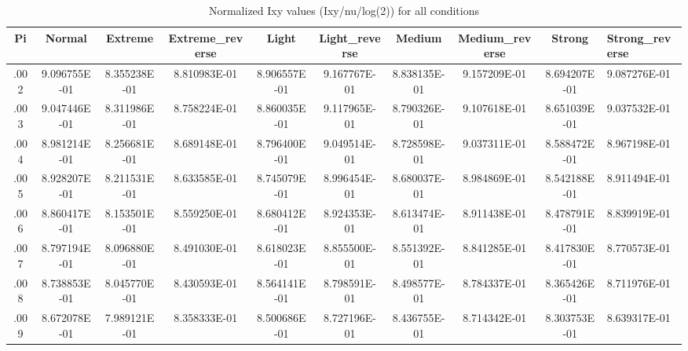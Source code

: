\begin{table}[htbp]
\centering
\caption{Normalized Ixy values (Ixy/nu/log(2)) for all conditions}
\begin{tabular}{|c|cccccccc|}
\hline
Pi & Normal & Extreme & Extreme\_reverse & Light & Light\_reverse & Medium & Medium\_reverse & Strong & Strong\_reverse \\
\hline
.002 & 9.096755E-01 & 8.355238E-01 & 8.810983E-01 & 8.906557E-01 & 9.167767E-01 & 8.838135E-01 & 9.157209E-01 & 8.694207E-01 & 9.087276E-01 \\
.003 & 9.047446E-01 & 8.311986E-01 & 8.758224E-01 & 8.860035E-01 & 9.117965E-01 & 8.790326E-01 & 9.107618E-01 & 8.651039E-01 & 9.037532E-01 \\
.004 & 8.981214E-01 & 8.256681E-01 & 8.689148E-01 & 8.796400E-01 & 9.049514E-01 & 8.728598E-01 & 9.037311E-01 & 8.588472E-01 & 8.967198E-01 \\
.005 & 8.928207E-01 & 8.211531E-01 & 8.633585E-01 & 8.745079E-01 & 8.996454E-01 & 8.680037E-01 & 8.984869E-01 & 8.542188E-01 & 8.911494E-01 \\
.006 & 8.860417E-01 & 8.153501E-01 & 8.559250E-01 & 8.680412E-01 & 8.924353E-01 & 8.613474E-01 & 8.911438E-01 & 8.478791E-01 & 8.839919E-01 \\
.007 & 8.797194E-01 & 8.096880E-01 & 8.491030E-01 & 8.618023E-01 & 8.855500E-01 & 8.551392E-01 & 8.841285E-01 & 8.417830E-01 & 8.770573E-01 \\
.008 & 8.738853E-01 & 8.045770E-01 & 8.430593E-01 & 8.564141E-01 & 8.798591E-01 & 8.498577E-01 & 8.784337E-01 & 8.365426E-01 & 8.711976E-01 \\
.009 & 8.672078E-01 & 7.989121E-01 & 8.358333E-01 & 8.500686E-01 & 8.727196E-01 & 8.436755E-01 & 8.714342E-01 & 8.303753E-01 & 8.639317E-01 \\
\hline
\end{tabular}
\end{table}

